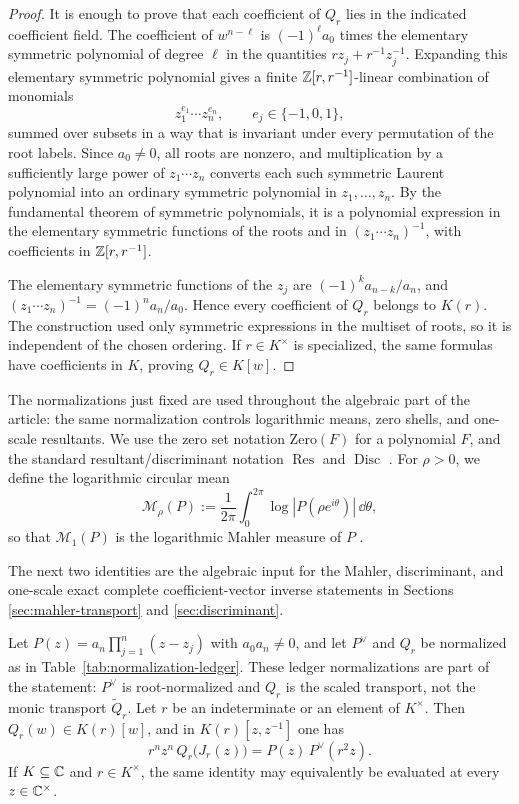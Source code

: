 \begin{proof}
It is enough to prove that each coefficient of \(Q_r\) lies in the indicated coefficient field.  The coefficient of \(w^{n-\ell}\) is \((-1)^\ell a_0\) times the elementary symmetric polynomial of degree \(\ell\) in the quantities \(r z_j+r^{-1}z_j^{-1}\).  Expanding this elementary symmetric polynomial gives a finite \(\mathbb{Z}[r,r^{-1}]\)-linear combination of monomials
\[
z_1^{e_1}\cdots z_n^{e_n},
\qquad e_j\in\{-1,0,1\},
\]
summed over subsets in a way that is invariant under every permutation of the root labels.  Since \(a_0\ne0\), all roots are nonzero, and multiplication by a sufficiently large power of \(z_1\cdots z_n\) converts each such symmetric Laurent polynomial into an ordinary symmetric polynomial in \(z_1,
\dots,z_n\).  By the fundamental theorem of symmetric polynomials, it is a polynomial expression in the elementary symmetric functions of the roots and in \((z_1\cdots z_n)^{-1}\), with coefficients in \(\mathbb{Z}[r,r^{-1}]\).

The elementary symmetric functions of the \(z_j\) are \((-1)^k a_{n-k}/a_n\), and \((z_1\cdots z_n)^{-1}=(-1)^n a_n/a_0\).  Hence every coefficient of \(Q_r\) belongs to \(K(r)\).  The construction used only symmetric expressions in the multiset of roots, so it is independent of the chosen ordering.  If \(r\in K^\times\) is specialized, the same formulas have coefficients in \(K\), proving \(Q_r\in K[w]\).
\end{proof}

The normalizations just fixed are used throughout the algebraic part of the article: the same normalization controls logarithmic means, zero shells, and one-scale resultants. We use the zero set notation \(\mathrm{Zero}(F)\) for a polynomial \(F\), and the standard resultant/discriminant notation \(\operatorname{Res}\) and \(\operatorname{Disc}\) \citep{GKZ1994}. For \(\rho>0\), we define the logarithmic circular mean
\[
\mathcal M_\rho(P):=\frac{1}{2\pi}\int_{0}^{2\pi}\log|P(\rho e^{i\theta})|\,\dd\theta,
\]
so that \(\mathcal M_1(P)\) is the logarithmic Mahler measure of \(P\) \citep{Mahler1962,EverestWard1999}.

The next two identities are the algebraic input for the Mahler, discriminant, and one-scale exact complete coefficient-vector inverse statements in Sections \ref{sec:mahler-transport} and \ref{sec:discriminant}.

\begin{theorem}\label{thm:pullback-factorization}
Let \(P(z)=a_n\prod_{j=1}^n(z-z_j)\) with \(a_0a_n\ne0\), and let \(P^\vee\) and \(Q_r\) be normalized as in Table~\ref{tab:normalization-ledger}.  These ledger normalizations are part of the statement: \(P^\vee\) is root-normalized and \(Q_r\) is the scaled transport, not the monic transport \(\widetilde Q_r\).  Let \(r\) be an indeterminate or an element of \(K^\times\). Then \(Q_r(w)\in K(r)[w]\), and in \(K(r)[z,z^{-1}]\) one has
\[
\boxed{\;
r^n z^n\,Q_r\!\bigl(J_r(z)\bigr)=P(z)\,P^\vee(r^2 z).
\;}
\]
If \(K\subseteq\mathbb{C}\) and \(r\in K^\times\), the same identity may equivalently be evaluated at every \(z\in\mathbb{C}^\times\).
\end{theorem}

